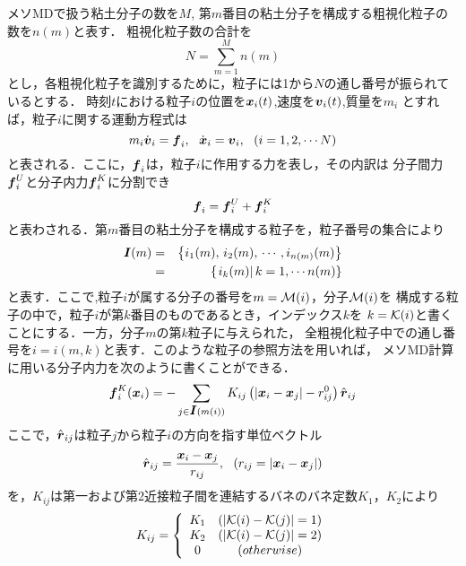 ﻿\documentclass[11pt,a4j]{jarticle}
\begin{document}
メソMDで扱う粘土分子の数を$M$, 第$m$番目の粘土分子を構成する粗視化粒子の数を$n(m)$と表す．
粗視化粒子数の合計を
\begin{equation}
	N=\sum_{m=1}^M n(m)
	\label{eqn:N_tot}
\end{equation}
とし，各粗視化粒子を識別するために，粒子には1から$N$の通し番号が振られているとする．
時刻$t$における粒子$i$の位置を$\mbox{\boldmath $x$}_i(t)$,速度を$\mbox{\boldmath $v$}_i(t)$,質量を$m_i$
とすれば，粒子$i$に関する運動方程式は
\begin{equation}
	m_i \dot {\fat{v}}_i =\fat{f}_i ,\ \ 
	\dot{\fat{x}}_i = \fat{v}_i, \ \ ( i =1,2,\cdots N )
	\label{eqn:eq_mot}
\end{equation}
と表される．ここに，$\mbox{\boldmath $f$}_i$は，粒子$i$に作用する力を表し，その内訳は
分子間力$\mbox{\boldmath $f$}_i^{U}$と分子内力$\mbox{\boldmath $f$}_i^{K}$に分割でき
\begin{equation}
	\mbox{\boldmath $f$}_i=\mbox{\boldmath $f$}_i^U+\mbox{\boldmath $f$}_i^K
	\label{eqn:f_tot}
\end{equation}
と表わされる．第$m$番目の粘土分子を構成する粒子を，粒子番号の集合により
\begin{eqnarray}
	\mbox{\boldmath $I$}(m) &=&
	\left\{ 
		i_1(m), \, i_2(m), \, \cdots, i_{n(m)}(m)
	\right\}
	 \nonumber \\
	&=&
	\left\{ 
		\left. i_k(m)\right| k=1,\cdots n(m)
	\right\}
	\label{eqn:set_Im}
\end{eqnarray}
と表す．ここで,粒子$i$が属する分子の番号を$m={\cal M}(i)$，分子${\cal M}(i)$を
構成する粒子の中で，粒子$i$が第$k$番目のものであるとき，インデックス$k$を
$k={\cal K}(i)$と書くことにする．一方，分子$m$の第$k$粒子に与えられた，
全粗視化粒子中での通し番号を$i=i(m,k)$と表す．このような粒子の参照方法を用いれば，
メソMD計算に用いる分子内力を次のように書くことができる．
\begin{equation}
	\mbox{\boldmath $f$}^K_i(\mbox{\boldmath $x$}_i)=
	-\sum_{j \in \mbox{\boldmath $I$}(m(i))} K_{ij}
	 \left( \left| \mbox{\boldmath $x$}_i -\mbox{\boldmath $x$}_j \right|-r^0_{ij}\right)
	\hat{\mbox{\boldmath $r$}}_{ij}
	\label{eqn:}
\end{equation}
ここで，$\hat{\mbox{\boldmath $r$}}_{ij}$は粒子$j$から粒子$i$の方向を指す単位ベクトル
\begin{equation}
	\hat{\mbox{\boldmath $r$}}_{ij} = \frac{\mbox{\boldmath $x$}_i-\mbox{\boldmath $x$}_j}
	{r_{ij}}, \ \ \left( r_{ij}=\left| \mbox{\boldmath $x$}_i-\mbox{\boldmath $x$}_j\right|\right)
	\label{eqn:}
\end{equation}
を，$K_{ij}$は第一および第2近接粒子間を連結するバネのバネ定数$K_1$，$K_2$により
\begin{equation}
	K_{ij}=\left\{
	\begin{array}{cc}
		K_1 & \left(\left|{\cal K}(i)-{\cal K}(j)\right|=1\right) \\
		K_2 & \left(\left|{\cal K}(i)-{\cal K}(j)\right|=2\right) \\
		0   & (otherwise)
	\end{array}
	\right.
	\label{eqn:}
\end{equation}
\end{document}
